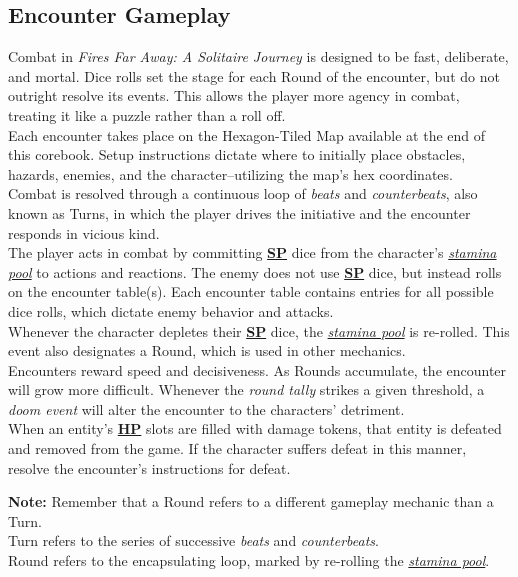 \documentclass[12pt]{article}
\newcommand{\refto}[1]{\hyperlink{#1}{\textbf{#1}}}
\newcommand{\reftoit}[1]{\hyperlink{#1}{\emph{#1}}}
\begin{document}
\begin{multicols*}{2}
\section{Encounter Gameplay}
Combat in \emph{Fires Far Away: A Solitaire Journey} is designed to be fast, deliberate, and mortal. Dice rolls set the stage for each Round of the encounter, but do not outright resolve its events. This allows the player more agency in combat, treating it like a puzzle rather than a roll off.\\
Each encounter takes place on the Hexagon-Tiled Map available at the end of this corebook. Setup instructions dictate where to initially place obstacles, hazards, enemies, and the character--utilizing the map’s hex coordinates.\\
Combat is resolved through a continuous loop of \emph{beats} and \emph{counterbeats}, also known as Turns, in which the player drives the initiative and the encounter responds in vicious kind.\\
The player acts in combat by committing \refto{SP} dice from the character’s \reftoit{stamina pool} to actions and reactions. The enemy does not use \refto{SP} dice, but instead rolls on the encounter table(s). Each encounter table contains entries for all possible dice rolls, which dictate enemy behavior and attacks.\\
Whenever the character depletes their \refto{SP} dice, the \reftoit{stamina pool} is re-rolled. This event also designates a Round, which is used in other mechanics.\\
Encounters reward speed and decisiveness. As Rounds accumulate, the encounter will grow more difficult. Whenever the \emph{round tally} strikes a given threshold, a \emph{doom event} will alter the encounter to the characters’ detriment.\\
When an entity’s \refto{HP} slots are filled with damage tokens, that entity is defeated and removed from the game. If the character suffers defeat in this manner, resolve the encounter’s instructions for defeat.\\
\begin{tcolorbox}
\textbf{Note:} Remember that a Round refers to a different gameplay mechanic than a Turn.\\
Turn refers to the series of successive \emph{beats} and \emph{counterbeats}.\\
Round refers to the encapsulating loop, marked by re-rolling the \reftoit{stamina pool}.
\end{tcolorbox}


\end{multicols*}
\end{document}
